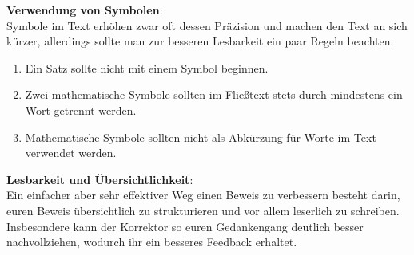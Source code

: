 \textbf{Verwendung von Symbolen}: \\
Symbole im Text erhöhen zwar oft dessen Präzision und machen den Text an sich
kürzer, allerdings sollte man zur besseren Lesbarkeit ein paar Regeln beachten.
\begin{enumerate}
\item Ein Satz sollte nicht mit einem Symbol beginnen.
\item Zwei mathematische Symbole sollten im Fließtext stets durch mindestens
ein Wort getrennt werden.
\item Mathematische Symbole sollten nicht als Abkürzung für Worte im Text
verwendet werden.
\end{enumerate}

\textbf{Lesbarkeit und Übersichtlichkeit}: \\
Ein einfacher aber sehr effektiver Weg einen Beweis zu verbessern besteht darin,
euren Beweis übersichtlich zu strukturieren und vor allem leserlich zu schreiben.
Insbesondere kann der Korrektor so euren Gedankengang deutlich besser
nachvollziehen, wodurch ihr ein besseres Feedback erhaltet.
